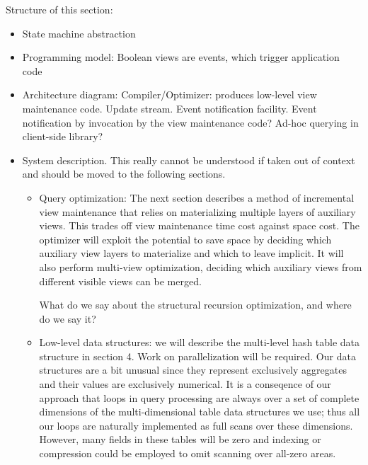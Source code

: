 Structure of this section:
\begin{itemize}
\item
State machine abstraction

\item
Programming model: Boolean views are events, which trigger application code

\item
Architecture diagram:
Compiler/Optimizer: produces low-level view maintenance code.
Update stream.
Event notification facility.
Event notification by invocation by the view maintenance code?
Ad-hoc querying in client-side library?

\item
System description.
This really cannot be understood if taken out of context and should be moved to the following sections.
\begin{itemize}
\item
Query optimization: The next section describes a method of incremental view maintenance that relies on materializing multiple layers of auxiliary views. This trades off view maintenance time cost against space cost. The optimizer will exploit the potential to save space by  deciding which auxiliary view layers to materialize and which to leave implicit. It will also perform
multi-view optimization, deciding which auxiliary views from different visible views can be merged.

What do we say about the structural recursion optimization, and where do we say it?

\item
Low-level data structures: we will describe the multi-level hash table data structure in section 4. Work on parallelization will be required. Our data structures are a bit unusual since they represent exclusively aggregates and their values are exclusively numerical. It is a conseqence of our approach that loops in query processing are always over a set of complete dimensions of the multi-dimensional table data structures we use; thus all our loops are naturally implemented as full scans over these dimensions. However, many fields in these tables will be zero and indexing or compression could be employed to omit scanning over all-zero areas.
\end{itemize}
\end{itemize}



